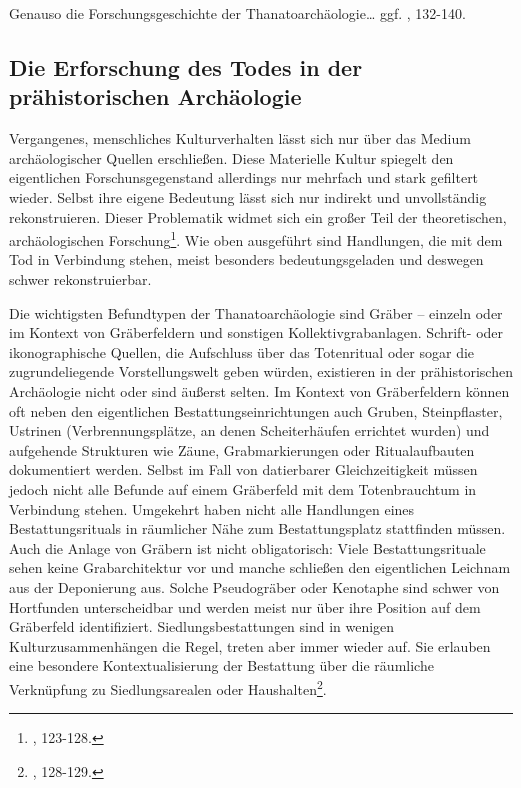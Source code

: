 \documentclass[openany,twoside,twocolumn]{book}
\let\rmarkdownfootnote\footnote%
\def\footnote{\protect\rmarkdownfootnote}
\begin{document}
Genauso die Forschungsgeschichte der Thanatoarchäologie\ldots{} ggf.
\textcite{hofmann_rituelle_2008}, 132-140.

\hypertarget{die-erforschung-des-todes-in-der-prahistorischen-archaologie}{%
\subsection{Die Erforschung des Todes in der prähistorischen
Archäologie}\label{die-erforschung-des-todes-in-der-prahistorischen-archaologie}}

Vergangenes, menschliches Kulturverhalten lässt sich nur über das Medium
archäologischer Quellen erschließen. Diese Materielle Kultur spiegelt
den eigentlichen Forschunsgegenstand allerdings nur mehrfach und stark
gefiltert wieder. Selbst ihre eigene Bedeutung lässt sich nur indirekt
und unvollständig rekonstruieren. Dieser Problematik widmet sich ein
großer Teil der theoretischen, archäologischen Forschung\footnote{\textcite{hofmann_rituelle_2008},
  123-128.}. Wie oben ausgeführt sind Handlungen, die mit dem Tod in
Verbindung stehen, meist besonders bedeutungsgeladen und deswegen schwer
rekonstruierbar.

Die wichtigsten Befundtypen der Thanatoarchäologie sind Gräber --
einzeln oder im Kontext von Gräberfeldern und sonstigen
Kollektivgrabanlagen. Schrift- oder ikonographische Quellen, die
Aufschluss über das Totenritual oder sogar die zugrundeliegende
Vorstellungswelt geben würden, existieren in der prähistorischen
Archäologie nicht oder sind äußerst selten. Im Kontext von Gräberfeldern
können oft neben den eigentlichen Bestattungseinrichtungen auch Gruben,
Steinpflaster, Ustrinen (Verbrennungsplätze, an denen Scheiterhäufen
errichtet wurden) und aufgehende Strukturen wie Zäune, Grabmarkierungen
oder Ritualaufbauten dokumentiert werden. Selbst im Fall von datierbarer
Gleichzeitigkeit müssen jedoch nicht alle Befunde auf einem Gräberfeld
mit dem Totenbrauchtum in Verbindung stehen. Umgekehrt haben nicht alle
Handlungen eines Bestattungsrituals in räumlicher Nähe zum
Bestattungsplatz stattfinden müssen. Auch die Anlage von Gräbern ist
nicht obligatorisch: Viele Bestattungsrituale sehen keine
Grabarchitektur vor und manche schließen den eigentlichen Leichnam aus
der Deponierung aus. Solche Pseudogräber oder Kenotaphe sind schwer von
Hortfunden unterscheidbar und werden meist nur über ihre Position auf
dem Gräberfeld identifiziert. Siedlungsbestattungen sind in wenigen
Kulturzusammenhängen die Regel, treten aber immer wieder auf. Sie
erlauben eine besondere Kontextualisierung der Bestattung über die
räumliche Verknüpfung zu Siedlungsarealen oder Haushalten\footnote{\textcite{hofmann_rituelle_2008},
  128-129.}.
\end{document}
